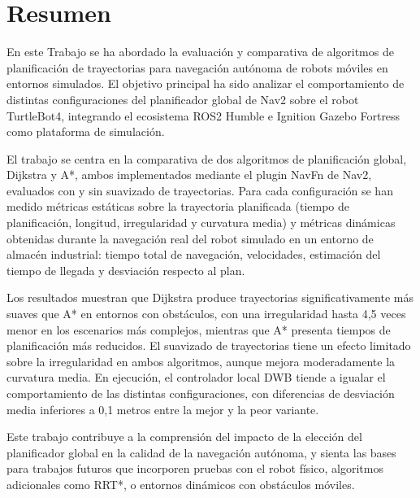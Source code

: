 \chapter*{Resumen}

En este Trabajo se ha abordado la evaluación y comparativa de algoritmos de planificación de trayectorias para navegación autónoma de robots móviles en entornos simulados. El objetivo principal ha sido analizar el comportamiento de distintas configuraciones del planificador global de Nav2 sobre el robot TurtleBot4, integrando el ecosistema ROS2 Humble e Ignition Gazebo Fortress como plataforma de simulación.

El trabajo se centra en la comparativa de dos algoritmos de planificación global, Dijkstra y A*, ambos implementados mediante el plugin NavFn de Nav2, evaluados con y sin suavizado de trayectorias. Para cada configuración se han medido métricas estáticas sobre la trayectoria planificada (tiempo de planificación, longitud, irregularidad y curvatura media) y métricas dinámicas obtenidas durante la navegación real del robot simulado en un entorno de almacén industrial: tiempo total de navegación, velocidades, estimación del tiempo de llegada y desviación respecto al plan.

Los resultados muestran que Dijkstra produce trayectorias significativamente más suaves que A* en entornos con obstáculos, con una irregularidad hasta 4,5 veces menor en los escenarios más complejos, mientras que A* presenta tiempos de planificación más reducidos. El suavizado de trayectorias tiene un efecto limitado sobre la irregularidad en ambos algoritmos, aunque mejora moderadamente la curvatura media. En ejecución, el controlador local DWB tiende a igualar el comportamiento de las distintas configuraciones, con diferencias de desviación media inferiores a 0,1 metros entre la mejor y la peor variante.

Este trabajo contribuye a la comprensión del impacto de la elección del planificador global en la calidad de la navegación autónoma, y sienta las bases para trabajos futuros que incorporen pruebas con el robot físico, algoritmos adicionales como RRT*, o entornos dinámicos con obstáculos móviles.
